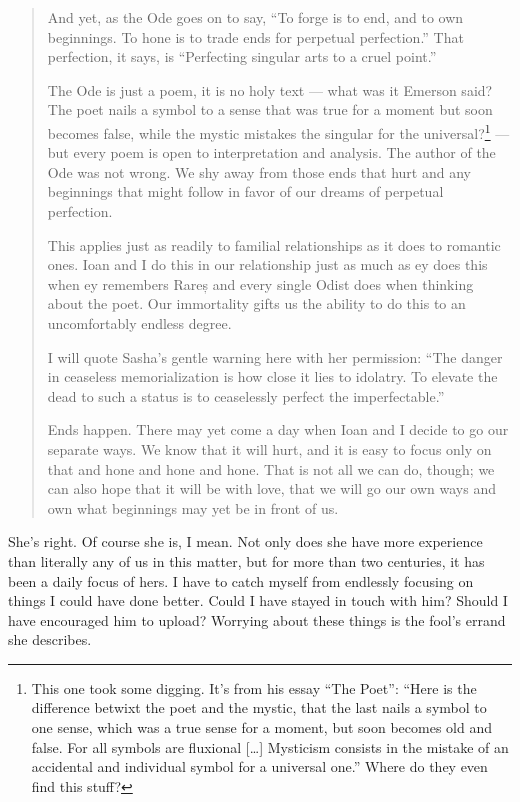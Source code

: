 \begin{quote}
And yet, as the Ode goes on to say, ``To forge is to end, and to own beginnings. To hone is to trade ends for perpetual perfection.'' That perfection, it says, is ``Perfecting singular arts to a cruel point.''

The Ode is just a poem, it is no holy text — what was it Emerson said? The poet nails a symbol to a sense that was true for a moment but soon becomes false, while the mystic mistakes the singular for the universal?\footnote{This one took some digging. It's from his essay ``The Poet'': ``Here is the difference betwixt the poet and the mystic, that the last nails a symbol to one sense, which was a true sense for a moment, but soon becomes old and false. For all symbols are fluxional {[}\ldots{}{]} Mysticism consists in the mistake of an accidental and individual symbol for a universal one.'' Where do they even find this stuff?} — but every poem is open to interpretation and analysis. The author of the Ode was not wrong. We shy away from those ends that hurt and any beginnings that might follow in favor of our dreams of perpetual perfection.

This applies just as readily to familial relationships as it does to romantic ones. Ioan and I do this in our relationship just as much as ey does this when ey remembers Rareș and every single Odist does when thinking about the poet. Our immortality gifts us the ability to do this to an uncomfortably endless degree.

I will quote Sasha's gentle warning here with her permission: ``The danger in ceaseless memorialization is how close it lies to idolatry. To elevate the dead to such a status is to ceaselessly perfect the imperfectable.''

Ends happen. There may yet come a day when Ioan and I decide to go our separate ways. We know that it will hurt, and it is easy to focus only on that and hone and hone and hone. That is not all we can do, though; we can also hope that it will be with love, that we will go our own ways and own what beginnings may yet be in front of us.
\end{quote}

She's right. Of course she is, I mean. Not only does she have more experience than literally any of us in this matter, but for more than two centuries, it has been a daily focus of hers. I have to catch myself from endlessly focusing on things I could have done better. Could I have stayed in touch with him? Should I have encouraged him to upload? Worrying about these things is the fool's errand she describes.


